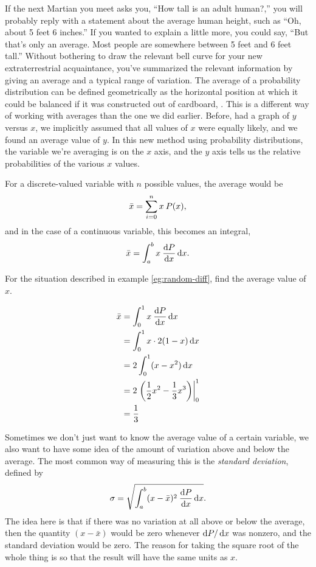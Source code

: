 If the next Martian you meet asks you, ``How tall is an
adult human?,'' you will probably reply with a statement
about the average human height, such as ``Oh, about 5 feet 6
inches.'' If you wanted to explain a little more, you could
say, ``But that's only an average. Most people are somewhere
between 5 feet and 6 feet tall.'' Without bothering to draw
the relevant bell curve for your new extraterrestrial
acquaintance, you've summarized the relevant information by
giving an average and a typical range of variation.
The average of a probability distribution can be defined
geometrically as the horizontal position at which it could
be balanced if it was constructed out of cardboard, .
This is a different way of working with averages than the one
we did earlier. Before, had a graph of $y$ versus $x$, we implicitly
assumed that all values of $x$ were equally likely, and we found an
average value of $y$. In this new method using probability distributions,
the variable we're averaging is on the $x$ axis, and the $y$ axis
tells us the relative probabilities of the various $x$ values.

For a discrete-valued variable with $n$ possible values, the average would be
\begin{equation*}
  \bar{x} = \sum_{i=0}^n x\:P(x),
\end{equation*}
and in the case of a continuous variable, this becomes an integral,
\begin{equation*}
  \bar{x} = \int_a^b x\:\frac{\operatorname{d\!} P}{\operatorname{d\!} x} \operatorname{d\!} x.
\end{equation*}

\begin{eg}
\egquestion For the situation described in example \ref{eg:random-diff},
find the average value of $x$.

\eganswer
\begin{align*}
  \bar{x} &= \int_0^1 x\:\frac{\operatorname{d\!} P}{\operatorname{d\!} x} \operatorname{d\!} x \\
          &= \int_0^1 x \cdot 2(1-x)\operatorname{d\!} x \\
          &= 2\int_0^1 (x-x^2)\operatorname{d\!} x \\
          &= 2\left. \left(\frac{1}{2}x^2-\frac{1}{3}x^3\right) \right|_0^1 \\
          &= \frac{1}{3}
\end{align*}
\end{eg}

Sometimes we don't just want to know the average value of a certain variable, we
also want to have some idea of the amount of variation above and below the average.
The most common way of measuring this is the \emph{standard deviation},
defined by
\begin{equation*}
  \sigma = \sqrt{\int_a^b (x-\bar{x})^2\:\frac{\operatorname{d\!} P}{\operatorname{d\!} x} \operatorname{d\!} x}.
\end{equation*}
The idea here is that if there was no variation at all above or below the average,
then the quantity $(x-\bar{x})$ would be zero whenever $\operatorname{d\!} P/\operatorname{d\!} x$ was nonzero, and
the standard deviation would be zero. The reason for taking the square root of the whole
thing is so that the result will have the same units as $x$.

